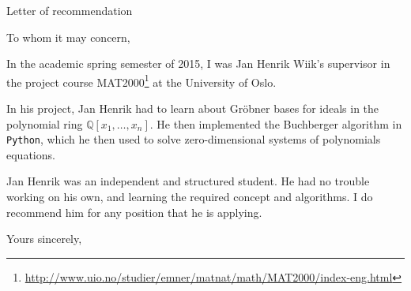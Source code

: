 \documentclass[UKenglish, math]{uioletter}
\begin{document}
\begin{letter}{Letter of recommendation}
\opening{To whom it may concern,}

In the academic spring semester of 2015, I was Jan Henrik Wiik's supervisor in the project course MAT2000\footnote{\url{http://www.uio.no/studier/emner/matnat/math/MAT2000/index-eng.html}} at the University of Oslo.

In his project, Jan Henrik had to learn about Gröbner bases for ideals in the polynomial ring $\mathbb Q[x_1,\ldots,x_n]$. He then implemented the Buchberger algorithm in \texttt{Python}, which he then used to solve zero-dimensional systems of polynomials equations.

Jan Henrik was an independent and structured student. He had no trouble working on his own, and learning the required concept and algorithms. I do recommend him for any position that he is applying.

\closing{Yours sincerely,}
\end{letter}
\end{document}
